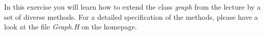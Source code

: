 In this exercise you will learn how to extend the class \emph{graph} from the 
lecture by a set of diverse methods. For a detailed specification of the 
methods, please have a look at the file  \emph{Graph.H} on the homepage.